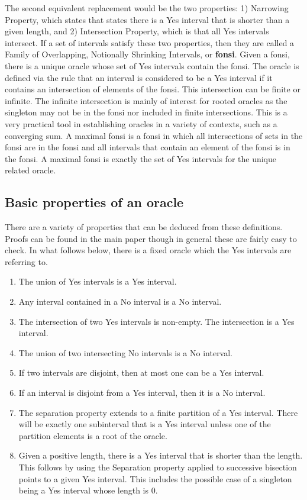 \documentclass[12pt]{article}
\theoremstyle{remark}
\begin{document}
The second equivalent replacement would be the two properties: 1) Narrowing Property, which states that states there is a Yes interval that is shorter than a given length, and 2) Intersection Property, which is that all Yes intervals intersect. If a set of intervals satisfy these two properties, then they are called a Family of Overlapping, Notionally Shrinking Intervals, or \textbf{fonsi}. Given a fonsi, there is a unique oracle whose set of Yes intervals contain the fonsi. The oracle is defined via the rule that an interval is considered to be a Yes interval if it contains an intersection of elements of the fonsi. This intersection can be finite or infinite. The infinite intersection is mainly of interest for rooted oracles as the singleton may not be in the fonsi nor included in finite intersections. This is a very practical tool in establishing oracles in a variety of contexts, such as a converging sum. A maximal fonsi is a fonsi in which all intersections of sets in the fonsi are in the fonsi and all intervals that contain an element of the fonsi is in the fonsi. A maximal fonsi is exactly the set of Yes intervals for the unique related oracle. 


\subsection{Basic properties of an oracle}

There are a variety of properties that can be deduced from these definitions. Proofs can be found in the main paper though in general these are fairly easy to check. In what follows below, there is a fixed oracle which the Yes intervals are referring to.

\begin{enumerate}
    \item The union of Yes intervals is a Yes interval. 
    \item Any interval contained in a No interval is a No interval. 
    \item The intersection of two Yes intervals is non-empty. The intersection is a Yes interval. 
    \item The union of two intersecting No intervals is a No interval. 
    \item If two intervals are disjoint, then at most one can be a Yes interval. 
    \item If an interval is disjoint from a Yes interval, then it is a No interval. 
    \item The separation property extends to a finite partition of a Yes interval. There will be exactly one subinterval that is a Yes interval unless one of the partition elements is a root of the oracle.   
    \item Given a positive length, there is a Yes interval that is shorter than the length. This follows by using the Separation property applied to successive bisection points to a given Yes interval. This includes the possible case of a singleton being a Yes interval whose length is 0. 
\end{enumerate}
\end{document}
